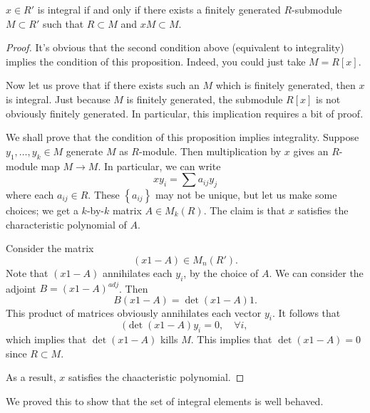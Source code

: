 \begin{proposition} 
$x \in R'$ is integral if and only if there exists a finitely generated
$R$-submodule $M \subset R'$ such that $R \subset M$ and $xM \subset M$.
\end{proposition} 
\begin{proof} 
It's obvious that the second condition above (equivalent to integrality) implies the condition of this
proposition. Indeed, you could just take $M = R[x]$.

Now let us prove that if there exists such an $M$ which is finitely generated,
then $x$ is integral. Just because $M$ is finitely generated, the
submodule $R[x]$ is not obviously finitely generated. In particular, this
implication  requires a bit of proof.


We shall prove that the condition of this proposition implies integrality.  
Suppose $y_1, \dots, y_k \in M$ generate $M$ as $R$-module. Then multiplication
by $x$ gives an $R$-module map $M \to M$. In particular, we can write
\[ xy_i = \sum a_{ij} y_j  \]
where each $a_{ij} \in R$.
These $\left\{a_{ij}\right\}$ may not be unique, but let us make some choices;
we get a $k$-by-$k$ matrix $A \in M_k(R)$. The claim is that $x$ satisfies the
characteristic polynomial of $A$.

Consider the matrix
\[ (x 1 - A) \in M_n(R').  \]
Note that $(x1-A)$ annihilates each $y_i$, by the choice of $A$.
We can consider the adjoint $B = (x1  -A)^{adj}$.  Then 
\[ B(x1 - A) = \det(x1 - A) 1.  \]
This product of matrices obviously annihilates each vector $y_i$.  It follows
that
\[ (\det(x1 - A) y_i = 0, \quad \forall i,  \]
which implies that $\det (x1-A)$ kills $M$. This implies that $\det (x1 - A)=0$ since $R \subset M$.

As a result, $x$ satisfies the chaacteristic polynomial.
\end{proof} 

We proved this to show that the set of integral elements is well behaved.

